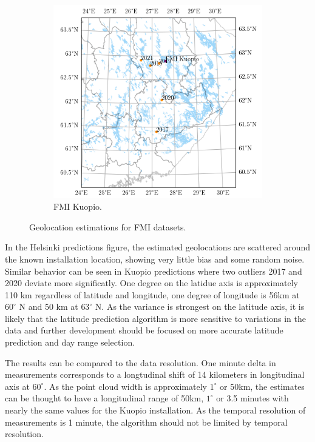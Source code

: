 \begin{figure}[h]
\begin{subfigure}[b]{0.45\textwidth}
         \includegraphics[width=\textwidth]{pics/geolocationmap3}
         \caption{FMI Kuopio.}
         
         \label{fig_geolocationkuopio}
     \end{subfigure}
     \hfill
     \caption{Geolocation estimations for FMI datasets.}
     \label{fig_anglespace}
\end{figure}

\noindent In the Helsinki predictions figure, the estimated geolocations are scattered around the known installation location, showing very little bias and some random noise. Similar behavior can be seen in Kuopio predictions where two outliers 2017 and 2020 deviate more significatly. One degree on the latidue axis is approximately 110 km regardless of latitude and longitude, one degree of longitude is 56km at $60^\circ$ N and 50 km at $63^\circ$ N. As the variance is strongest on the latitude axis, it is likely that the latitude prediction algorithm is more sensitive to variations in the data and further development should be focused on more accurate latitude prediction and day range selection.


The results can be compared to the data resolution. One minute delta in measurements corresponds to a longtudinal shift of 14 kilometers in longitudinal axis at $60^\circ$. As the point cloud width is approximately $1^\circ$ or 50km, the estimates can be thought to have a longitudinal range of 50km, $1^\circ$ or 3.5 minutes with nearly the same values for the Kuopio installation. As the temporal resolution of measurements is 1 minute, the algorithm should not be limited by temporal resolution.